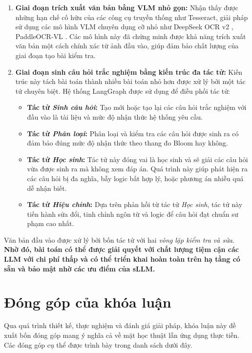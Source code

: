 \begin{enumerate}
    \item \textbf{Giai đoạn trích xuất văn bản bằng VLM nhỏ gọn:} Nhận thấy được những hạn chế cố hữu của các công cụ truyền thống như Tesseract, giải pháp sử dụng các mô hình VLM chuyên dụng cỡ nhỏ như DeepSeek OCR v2 \cite{deepseekocr2025}, PaddleOCR-VL \cite{paddleocr2025}. Các mô hình này đã chứng minh được khả năng trích xuất văn bản một cách chính xác từ ảnh đầu vào, giúp đảm bảo chất lượng của giai đoạn tạo bài kiểm tra.

    \item \textbf{Giai đoạn sinh câu hỏi trắc nghiệm bằng kiến trúc đa tác tử:} Kiến trúc này tách bài toán thành nhiều bài toán nhỏ hơn được xử lý bởi một tác tử chuyên biệt. Hệ thống LangGraph \cite{langgraph2024} được sử dụng để điều phối tác tử:
    \begin{itemize}
        \item \textbf{Tác tử \textit{Sinh câu hỏi}:} Tạo mới hoặc tạo lại các câu hỏi trắc nghiệm với đầu vào là tài liệu và mức độ nhận thức hệ thống yêu cầu.
        \item \textbf{Tác tử \textit{Phân loại}:} Phân loại và kiểm tra các câu hỏi được sinh ra có đảm bảo đúng mức độ nhận thức theo thang đo Bloom hay không.
        \item \textbf{Tác tử \textit{Học sinh}:} Tác tử này đóng vai là học sinh và sẽ giải các câu hỏi vừa được sinh ra mà không xem đáp án. Quá trình này giúp phát hiện ra các câu hỏi bị đa nghĩa, bẫy logic bất hợp lý, hoặc phương án nhiễu quá dễ nhận biết.
        \item \textbf{Tác tử \textit{Hiệu chỉnh}:} Dựa trên phản hồi từ tác tử \textit{Học sinh}, tác tử này tiến hành sửa đổi, tinh chỉnh ngôn từ và logic để câu hỏi đạt chuẩn sư phạm cao nhất.
    \end{itemize}
\end{enumerate}

Văn bản đầu vào được xử lý bởi bốn tác tử với hai \textit{vòng lặp kiểm tra và sửa}. \textbf{Nhờ đó, bài toán có thể được giải quyết với chất lượng tiệm cận các LLM với chi phí thấp và có thể triển khai hoàn toàn trên hạ tầng có sẵn và bảo mật nhờ các ưu điểm của sLLM.}

\section{Đóng góp của khóa luận}

Qua quá trình thiết kế, thực nghiệm và đánh giá giải pháp, khóa luận này đề xuất bốn đóng góp mang ý nghĩa cả về mặt học thuật lẫn ứng dụng thực tiễn. Các đóng góp cụ thể được trình bày trong danh sách dưới đây.

